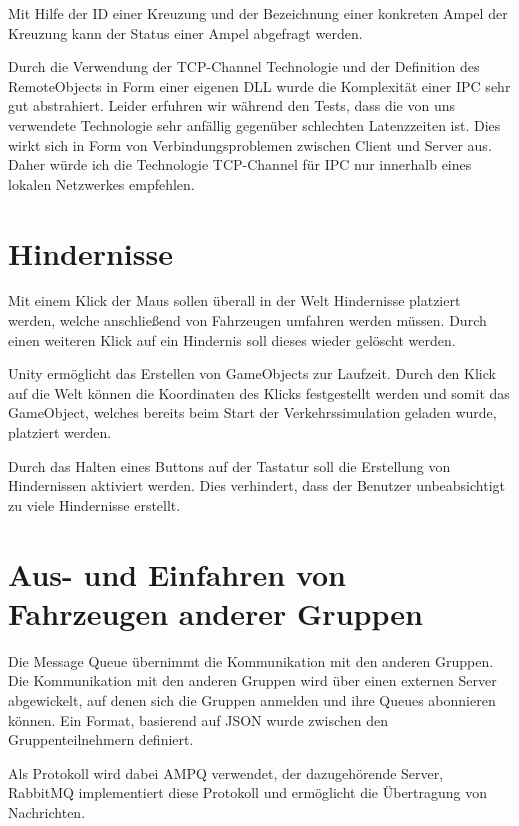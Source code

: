 Mit Hilfe der ID einer Kreuzung und der Bezeichnung einer konkreten Ampel der Kreuzung kann der Status einer Ampel abgefragt werden.

Durch die Verwendung der TCP-Channel Technologie und der Definition des RemoteObjects in Form einer eigenen DLL wurde die Komplexität einer IPC sehr gut abstrahiert. Leider erfuhren wir während den Tests, dass die von uns verwendete Technologie sehr anfällig gegenüber schlechten Latenzzeiten ist. Dies wirkt sich in Form von Verbindungsproblemen zwischen Client und Server aus. Daher würde ich die Technologie TCP-Channel für IPC nur innerhalb eines lokalen Netzwerkes empfehlen.


\section{Hindernisse}
\label{Hindernisse}

Mit einem Klick der Maus sollen überall in der Welt Hindernisse platziert werden, welche anschließend von Fahrzeugen umfahren werden müssen. Durch einen weiteren Klick auf ein Hindernis soll dieses wieder gelöscht werden. 

Unity ermöglicht das Erstellen von GameObjects zur Laufzeit. Durch den Klick auf die Welt können die Koordinaten des Klicks festgestellt werden und somit das GameObject, welches bereits beim Start der Verkehrssimulation geladen wurde, platziert werden.

Durch das Halten eines Buttons auf der Tastatur soll die Erstellung von Hindernissen aktiviert werden. Dies verhindert, dass der Benutzer unbeabsichtigt zu viele Hindernisse erstellt.

\section{Aus- und Einfahren von Fahrzeugen anderer Gruppen}

Die Message Queue übernimmt die Kommunikation mit den anderen Gruppen. Die Kommunikation mit den anderen Gruppen wird über einen externen Server abgewickelt, auf denen sich die Gruppen anmelden und ihre Queues abonnieren können. Ein Format, basierend auf JSON wurde zwischen den Gruppenteilnehmern definiert.

Als Protokoll wird dabei AMPQ verwendet, der dazugehörende Server, RabbitMQ implementiert diese Protokoll und ermöglicht die Übertragung von Nachrichten.